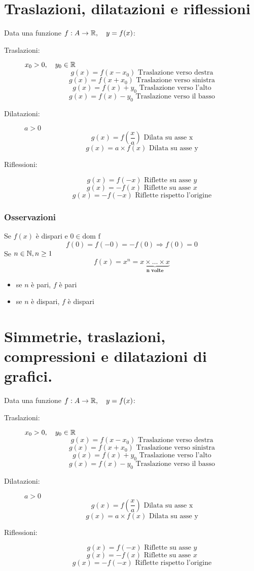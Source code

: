 \section{Traslazioni, dilatazioni e riflessioni}
Data una funzione $f: A \rightarrow \mathbb{R} , \quad y=f(x)$:
\begin{description}
	\item[Traslazioni:] $x_0 > 0, \quad y_0 \in \mathbb{R}$
		\[g(x)=f(x-x_0) \text{ Traslazione verso destra}\]
		\[g(x)=f(x+x_0) \text{ Traslazione verso sinistra}\]
		\[g(x)=f(x)+y_0 \text{ Traslazione verso l'alto}\]
		\[g(x)=f(x)-y_0 \text{ Traslazione verso il basso}\]
	\item[Dilatazioni:] $a>0$
		\[g(x)=f(\frac{x}{a}) \text{ Dilata su asse x}\]
		\[g(x)=a\times f(x) \text{ Dilata su asse y}\]
	\item[Riflessioni:]
		\[g(x)=f(-x) \text{ Riflette su asse }y\]
		\[g(x)=-f(x) \text{ Riflette su asse }x\]
		\[g(x)=-f(-x) \text{ Riflette rispetto l'origine}\]
\end{description}


\subsubsection{Osservazioni}
Se $f(x)$ è dispari e $0 \in \text{dom f}$
\[f(0)=f(-0)=-f(0)\Rightarrow f(0)=0\]
\newline
Se $n \in \mathbb{N}, n \geq 1$
\[f(x)=x^n= \underbrace{x \times \dots \times x}_{\textbf{n volte}}\]
\begin{itemize}
	\item se $n$ è pari, $f$ è pari
	\item se $n$ è dispari, $f$ è dispari
\end{itemize}

\section{Simmetrie, traslazioni, compressioni e dilatazioni di grafici.}
Data una funzione $f: A \rightarrow \mathbb{R} , \quad y=f(x)$:
\begin{description}
	\item[Traslazioni:] $x_0 > 0, \quad y_0 \in \mathbb{R}$
		\[g(x)=f(x-x_0) \text{ Traslazione verso destra}\]
		\[g(x)=f(x+x_0) \text{ Traslazione verso sinistra}\]
		\[g(x)=f(x)+y_0 \text{ Traslazione verso l'alto}\]
		\[g(x)=f(x)-y_0 \text{ Traslazione verso il basso}\]
	\item[Dilatazioni:] $a>0$
		\[g(x)=f(\frac{x}{a}) \text{ Dilata su asse x}\]
		\[g(x)=a\times f(x) \text{ Dilata su asse y}\]
	\item[Riflessioni:]
		\[g(x)=f(-x) \text{ Riflette su asse }y\]
		\[g(x)=-f(x) \text{ Riflette su asse }x\]
		\[g(x)=-f(-x) \text{ Riflette rispetto l'origine}\]
\end{description}

